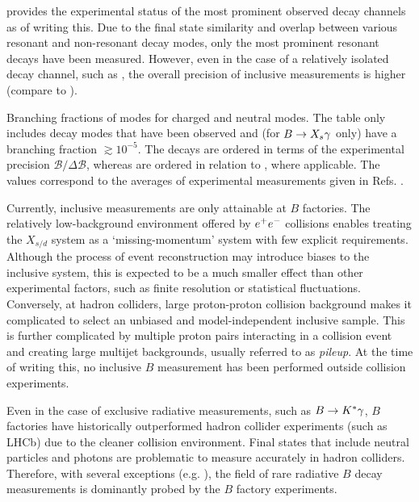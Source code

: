  provides the experimental status of the most prominent observed \BtoXsdgamma decay channels as of writing this.
Due to the final state similarity and overlap between various resonant and non-resonant decay modes, only the most prominent resonant decays have been measured.
However, even in the case of a relatively isolated decay channel, such as \BtoKstargamma, the overall precision of inclusive measurements is higher (compare to ).

{\renewcommand{\arraystretch}{1.2}
\begin{table}[hbtp!]
    \centering
    \caption{\label{tab:btosgamma_bfs} 
    Branching fractions of \BtoXsgamma modes for charged and neutral modes.
    The table only includes decay modes that have been observed and (for $\BtoXsgamma$ only) have a branching fraction $\gtrsim10^{-5}$.
    The \Bp decays are ordered in terms of the experimental precision $\mathcal{B}/\Delta\mathcal{B}$, whereas \Bz are ordered in relation to \Bp, where applicable.
    The values correspond to the averages of experimental measurements given in Refs. \cite{Amhis:2022mac,Workman:2022ynf}.
    }
    
\end{table}
}

Currently, inclusive measurements are only attainable at $B$ factories.
The relatively low-background environment offered by $e^+e^-$ collisions enables treating the $X_{s/d}$ system as a `missing-momentum' system with few explicit requirements.
Although the process of event reconstruction may introduce biases to the inclusive system, this is expected to be a much smaller effect than other experimental factors, such as finite resolution or statistical fluctuations.
Conversely, at hadron colliders,
large proton-proton collision background makes it complicated to select an unbiased and model-independent inclusive sample.
This is further complicated by multiple proton pairs interacting in a collision event and creating large multijet backgrounds, usually referred to as \textit{pileup}.
At the time of writing this, no inclusive $B$ measurement has been performed outside \epem collision experiments.

Even in the case of exclusive radiative measurements, such as $B\rightarrow K^*\gamma$, $B$ factories have historically outperformed hadron collider experiments (such as LHCb) due to the cleaner \epem collision environment.
Final states that include neutral particles and photons are problematic to measure accurately in hadron colliders.
Therefore, with several exceptions (e.g. \cite{Bellee:2019qbt}), the field of rare radiative $B$ decay measurements is dominantly probed by the $B$ factory experiments.




